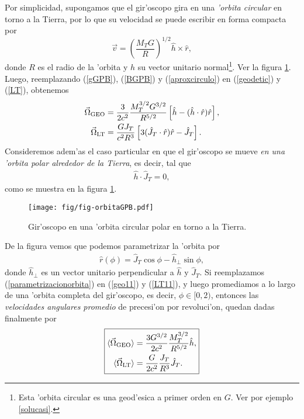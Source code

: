 Por simplicidad, supongamos que el gir'oscopo gira en una \textit{'orbita circular} en torno a la Tierra, por lo que su velocidad se puede escribir en forma compacta por
\begin{equation}
\vec{v}=\left(\frac{M_TG}{R}\right)^{1/2}\hat{h}\times\hat{r},\label{aproxcirculo}
\end{equation}
donde $R$ es el radio de la 'orbita y $\hat{h}$ su vector unitario normal\footnote{Esta 'orbita circular es una geod'esica a primer orden en $G$. Ver por ejemplo \eqref{solucasi}.}. Ver la figura \ref{orbitaGPB}. Luego, reemplazando (\ref{gGPB}), (\ref{BGPB}) y (\ref{aproxcirculo}) en (\ref{geodetic}) y (\ref{LT}), obtenemos
\begin{align}
\vec{\Omega}_{\rm GEO}={}&\frac{3}{2c^2}\frac{M_T^{3/2}G^{3/2}}{R^{5/2}}\left[\hat{h}-(\hat{h}\cdot\hat{r})\hat{r}\right],\label{geo11}\\
\vec{\Omega}_{\rm LT}={}&\frac{GJ_T}{c^2R^3}\left[3(\hat{J}_T\cdot\hat{r})\hat{r}-\hat{J}_T\right].\label{LT11}
\end{align}
Consideremos adem'as el caso particular en que el gir'oscopo se mueve \textit{en una 'orbita polar alrededor de la Tierra}, es decir, tal que
\begin{align}
\hat{h}\cdot\hat{J}_T=0,
\end{align}
como se muestra en la figura \ref{orbitaGPB}.
\begin{figure}[H]
\centering
\texttt{[image: fig/fig-orbitaGPB.pdf]}
\caption{Gir'oscopo en una 'orbita circular polar en torno a la Tierra.}
\label{orbitaGPB}
\end{figure}
De la figura vemos que podemos parametrizar la 'orbita por
\begin{align}
\hat{r}(\phi)=\hat{J}_T\cos\phi-\hat{h}_{\perp}\sin\phi,\label{parametrizacionorbita}
\end{align}
donde $\hat{h}_{\perp}$ es un vector unitario perpendicular a $\hat{h}$ y $\hat{J}_T$. Si reemplazamos (\ref{parametrizacionorbita}) en (\ref{geo11}) y (\ref{LT11}), y luego promediamos a lo largo de una 'orbita completa del gir'oscopo, es decir, $\phi\in[0,2)$, entonces las \emph{velocidades angulares promedio} de precesi'on por revoluci'on, quedan dadas finalmente por
\begin{equation}\boxed{
\begin{aligned}
\langle\vec{\Omega}_{\rm GEO}\rangle={}&\frac{3G^{3/2}}{2c^2}\frac{M_T^{3/2}}{R^{5/2}}\hat{h},\\
\langle\vec{\Omega}_{\rm LT}\rangle={}&\frac{G}{2c^2}\frac{J_T}{R^3}\hat{J}_T.\label{LT22}
\end{aligned}}
\end{equation}
